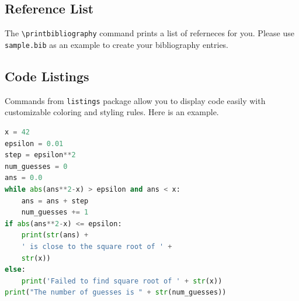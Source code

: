 \documentclass{article}
\begin{document}
\subsection{Reference List}
The \verb+\printbibliography+ command prints a list of referneces for you.
Please use \texttt{sample.bib} as an example to create your bibliography entries.

\subsection{Code Listings}
Commands from \texttt{listings} package allow you to display code easily with
customizable coloring and styling rules. Here is an example.

\begin{lstlisting}[language=Python,  caption=Python example]
x = 42
epsilon = 0.01
step = epsilon**2
num_guesses = 0
ans = 0.0
while abs(ans**2-x) > epsilon and ans < x:
    ans = ans + step
    num_guesses += 1
if abs(ans**2-x) <= epsilon:
    print(str(ans) +
    ' is close to the square root of ' +
    str(x))
else:
    print('Failed to find square root of ' + str(x))
print("The number of guesses is " + str(num_guesses))
\end{lstlisting}
\end{document}

